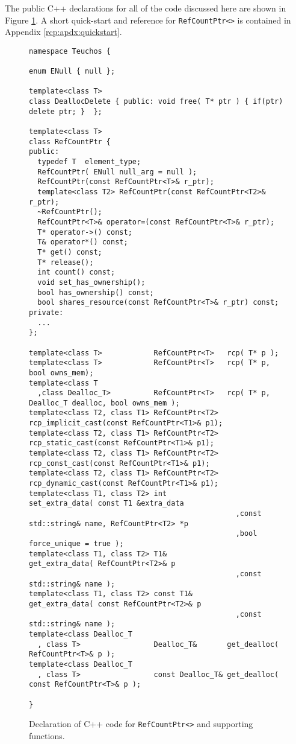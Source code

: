 The public C++ declarations for all of the code discussed here are
shown in Figure {}\ref{rcp:fig:decl}.  A short quick-start and
reference for {}\texttt{RefCountPtr<>} is contained in Appendix
{}\ref{rcp:apdx:quickstart}.

\begin{figure}

{\scriptsize\begin{verbatim}
namespace Teuchos {

enum ENull { null };

template<class T>
class DeallocDelete { public: void free( T* ptr ) { if(ptr) delete ptr; }  };

template<class T>
class RefCountPtr {
public:
  typedef T  element_type;
  RefCountPtr( ENull null_arg = null );
  RefCountPtr(const RefCountPtr<T>& r_ptr);
  template<class T2> RefCountPtr(const RefCountPtr<T2>& r_ptr);
  ~RefCountPtr();
  RefCountPtr<T>& operator=(const RefCountPtr<T>& r_ptr);
  T* operator->() const;
  T& operator*() const;
  T* get() const;
  T* release();
  int count() const;
  void set_has_ownership();
  bool has_ownership() const;
  bool shares_resource(const RefCountPtr<T>& r_ptr) const;
private:
  ...
};

template<class T>            RefCountPtr<T>   rcp( T* p );
template<class T>            RefCountPtr<T>   rcp( T* p, bool owns_mem);
template<class T
  ,class Dealloc_T>          RefCountPtr<T>   rcp( T* p, Dealloc_T dealloc, bool owns_mem );
template<class T2, class T1> RefCountPtr<T2>  rcp_implicit_cast(const RefCountPtr<T1>& p1);
template<class T2, class T1> RefCountPtr<T2>  rcp_static_cast(const RefCountPtr<T1>& p1);
template<class T2, class T1> RefCountPtr<T2>  rcp_const_cast(const RefCountPtr<T1>& p1);
template<class T2, class T1> RefCountPtr<T2>  rcp_dynamic_cast(const RefCountPtr<T1>& p1);
template<class T1, class T2> int              set_extra_data( const T1 &extra_data
                                                ,const std::string& name, RefCountPtr<T2> *p
                                                ,bool force_unique = true );
template<class T1, class T2> T1&              get_extra_data( RefCountPtr<T2>& p
                                                ,const std::string& name );
template<class T1, class T2> const T1&        get_extra_data( const RefCountPtr<T2>& p
                                                ,const std::string& name );
template<class Dealloc_T
  , class T>                 Dealloc_T&       get_dealloc( RefCountPtr<T>& p );
template<class Dealloc_T
  , class T>                 const Dealloc_T& get_dealloc( const RefCountPtr<T>& p );

}
\end{verbatim}}
\caption{\label{rcp:fig:decl}
Declaration of C++ code for {}\texttt{RefCountPtr<>} and supporting functions.}
\end{figure}

